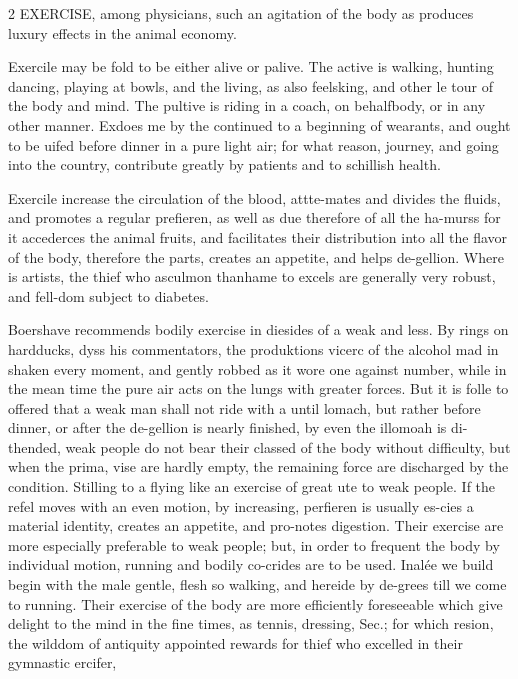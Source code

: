\documentclass[10pt]{article}
\begin{document}
\begin{multicols}{2}
EXERCISE, among physicians, such an agitation of the body as produces luxury effects in the animal economy.

Exercile may be fold to be either alive or palive. The active is walking, hunting dancing, playing at bowls, and the living, as also feelsking, and other le tour of the body and mind. The pultive is riding in a coach, on behalfbody, or in any other manner. Exdoes me by the continued to a beginning of wearants, and ought to be uifed before dinner in a pure light air; for what reason, journey, and going into the country, contribute greatly by patients and to schillish health.

Exercile increase the circulation of the blood, attte-mates and divides the fluids, and promotes a regular prefieren, as well as due therefore of all the ha-murss for it accederces the animal fruits, and facilitates their distribution into all the flavor of the body, therefore the parts, creates an appetite, and helps de-gellion. Where is artists, the thief who asculmon thanhame to excels are generally very robust, and fell-dom subject to diabetes.

Boershave recommends bodily exercise in diesides of a weak and less. By rings on hardducks, dyss his commentators, the produktions vicerc of the alcohol mad in shaken every moment, and gently robbed as it wore one against number, while in the mean time the pure air acts on the lungs with greater forces. But it is folle to offered that a weak man shall not ride with a until lomach, but rather before dinner, or after the de-gellion is nearly finished, by even the illomoah is di-thended, weak people do not bear their classed of the body without difficulty, but when the prima, vise are hardly empty, the remaining force are discharged by the condition. Stilling to a flying like an exercise of great ute to weak people. If the refel moves with an even motion, by increasing, perfieren is usually es-cies a material identity, creates an appetite, and pro-notes digestion. Their exercise are more especially preferable to weak people; but, in order to frequent the body by individual motion, running and bodily co-crides are to be used. Inalée we build begin with the male gentle, flesh so walking, and hereide by de-grees till we come to running. Their exercise of the body are more efficiently foreseeable which give delight to the mind in the fine times, as tennis, dressing, Sec.; for which resion, the wilddom of antiquity appointed rewards for thief who excelled in their gymnastic ercifer,

\end{multicols}
\end{document}
